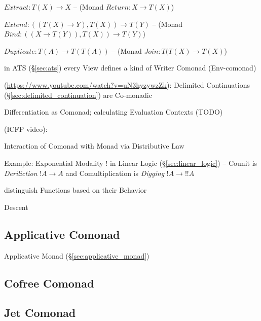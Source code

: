 $Extract : T(X) \rightarrow X$ -- (Monad $Return : X \rightarrow
T(X)$)

$Extend : ((T(X) \rightarrow Y), T(X)) \rightarrow T(Y)$ -- (Monad
$Bind : ((X \rightarrow T(Y)), T(X)) \rightarrow T(Y)$)

$Duplicate : T(A) \rightarrow T(T(A))$ -- (Monad
$Join : T(T(X) \rightarrow T(X)$)

in ATS (\S\ref{sec:ats}) every View defines a kind of Writer Comonad
(Env-comonad)

(\url{https://www.youtube.com/watch?v=uN3hyzywzZk}): Delimited Continuations
(\S\ref{sec:delimited_continuation}) are Co-monadic

Differentiation as Comonad; calculating Evaluation Contexts (TODO)


\asterism


(ICFP video):

Interaction of Comonad with Monad via Distributive Law %

Example: Exponential Modality $!$ in Linear Logic
(\S\ref{sec:linear_logic}) -- Counit is \emph{Deriliction} $!A
\rightarrow A$ and Comultiplication is \emph{Digging} $!A \rightarrow
!!A$

distinguish Functions based on their Behavior

Descent



\subsection{Applicative Comonad}\label{sec:applicative_comonad}

Applicative Monad (\S\ref{sec:applicative_monad})



\subsection{Cofree Comonad}\label{sec:cofree_comonad}

\subsection{Jet Comonad}\label{sec:jet_comonad}

